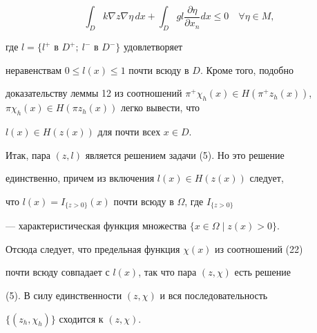 \begin{pf}
$$


\int_{D} k \nabla z \nabla \eta\, dx + \int_{D} gl \frac {\partial


\eta}{\partial x_n} dx \leq 0 \quad \forall \eta \in M,


$$


где $l=\{l^{+} \text{ в } D^{+};\ l^{-} \text{ в } D^{-} \}$ удовлетворяет


неравенствам $0 \leq l(x) \leq 1$ почти всюду в $D$. Кроме того, подобно


доказательству леммы 12 из соотношений $ \pi^+\chi_h(x) \in


H(\pi^+ z_h(x))$, $\pi \chi_h(x) \in H(\pi z_h(x))$ легко вывести, что


$l(x) \in H(z(x))$ для почти всех $x \in D$.





Итак, пара $(z,l)$ является решением задачи (5). Но это решение


единственно, причем из включения $ l(x) \in H(z(x))$ следует,


что $l(x) = I_{\{z>0\}}(x)$ почти всюду в $\Omega$, где $I_{\{z>0\}}$


--- характеристическая функция множества $\{ x \in \Omega \mid z(x) >0 \}$.


Отсюда следует, что предельная функция $\chi(x)$ из соотношений (22)


почти всюду совпадает с $l(x)$, так что пара $(z,\chi)$ есть решение


(5). В силу единственности $(z,\chi)$ и вся последовательность


$\{(z_h,\chi_h)\}$ сходится к $(z,\chi)$.


\end{pf}





